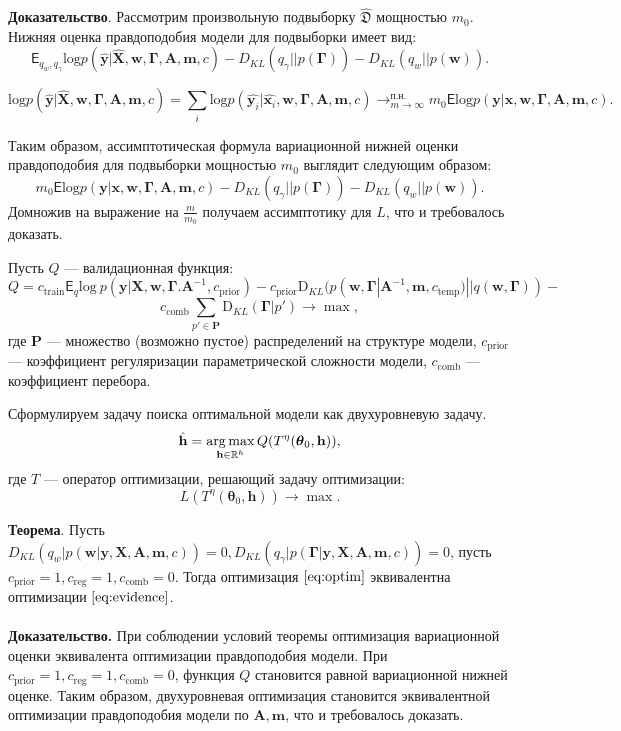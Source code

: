 \textbf{Доказательство}. Рассмотрим произвольную подвыборку $\hat{\mathfrak{D}}$ мощностью $m_0$. Нижняя оценка правдоподобия модели для подвыборки имеет вид:
\[
 \mathsf{E}_{q_w,q_\gamma}\text{log} p(\hat{\mathbf{y}}|\hat{\mathbf{X}},\mathbf{w}, \boldsymbol{\Gamma}, \mathbf{A},\mathbf{m}, c) - {D_{KL}}(q_\gamma||p(\boldsymbol{\Gamma})) - {D_{KL}}(q_{w}||p(\mathbf{w})).
\]

\[
\text{log} p(\hat{\mathbf{y}}|\hat{\mathbf{X}},\mathbf{w}, \boldsymbol{\Gamma}, \mathbf{A},\mathbf{m}, c) = \sum_i \text{log} p(\hat{\mathbf{y}_i}|\hat{\mathbf{x}_i},\mathbf{w}, \boldsymbol{\Gamma}, \mathbf{A},\mathbf{m}, c) \to^{\text{п.н.}}_{m \to \infty} m_0\mathsf{E}\text{log} p(\mathbf{y}|{\mathbf{x}},\mathbf{w}, \boldsymbol{\Gamma}, \mathbf{A},\mathbf{m}, c).
\]

Таким образом, ассимптотическая формула вариационной нижней оценки правдоподобия для подвыборки мощностью $m_0$ выглядит следующим образом:
\[
m_0\mathsf{E}\text{log} p(\mathbf{y}|{\mathbf{x}},\mathbf{w}, \boldsymbol{\Gamma}, \mathbf{A},\mathbf{m}, c) - {D_{KL}}(q_\gamma||p(\boldsymbol{\Gamma})) - {D_{KL}}(q_{w}||p(\mathbf{w})).
\]
Домножив на выражение на $\frac{m}{m_0}$ получаем ассимптотику для $L$, что и требовалось доказать.

Пусть $Q$ --- валидационная функция:
\[
Q = {c_\text{train}\mathsf{E}_q \text{log}~{p(\mathbf{y} | \mathbf{X}, \mathbf{w}, \boldsymbol{\Gamma}. \mathbf{A}^{-1}, c_{\text{prior}})}}
 - {c_\text{prior}\text{D}_{KL}(p(\mathbf{w}, \boldsymbol{\Gamma} |\mathbf{A}^{-1}, \mathbf{m}, c_{\text{temp}}) || q(\mathbf{w}, \boldsymbol{\Gamma}))} -\]
\[
{c_{\text{comb}}\sum_{p' \in \mathbf{P}} \text{D}_{KL}(\boldsymbol{\Gamma} | p')} \to \max, 
\]
где $\mathbf{P}$ --- множество (возможно пустое) распределений на структуре модели, $c_\text{prior}$ --- коэффициент регуляризации параметрической сложности модели, 
$c_{\text{comb}}$ --- коэффициент перебора.

Сформулируем задачу поиска оптимальной модели как двухуровневую задачу.
\begin{equation}
\label{eq:optim}
	\hat{\mathbf{h}} = \operatorname*{arg\,max}_{\mathbf{h} \in \mathbb{R}^h} Q( T^\eta(\boldsymbol{\theta}_0, \mathbf{h})),
\end{equation}
где $T$ --- оператор оптимизации, решающий задачу оптимизации:
\[
    L(T^\eta(\boldsymbol{\theta}_0, \mathbf{h})) \to \max.
\]


\textbf{Теорема}. Пусть $D_{KL}(q_w|p(\mathbf{w}|\mathbf{y}, \mathbf{X}, \mathbf{A},\mathbf{m}, c)) = 0, D_{KL}(q_\gamma|p(\boldsymbol{\Gamma}|\mathbf{y}, \mathbf{X}, \mathbf{A},\mathbf{m}, c)) = 0$, пусть $c_{\text{prior}} = 1, c_{\text{reg}} = 1, c_{\text{comb}} = 0$. Тогда оптимизация $\eqref{eq:optim}$ эквивалентна оптимизации $\eqref{eq:evidence}$.\\~\\
\textbf{Доказательство.} При соблюдении условий теоремы оптимизация вариационной оценки эквивалента оптимизации правдоподобия модели.
При $c_{\text{prior}} = 1, c_{\text{reg}} = 1, c_{\text{comb}} = 0$, функция $Q$ становится равной вариационной нижней оценке. 
Таким образом, двухуровневая оптимизация становится эквивалентной оптимизации правдоподобия модели по $\mathbf{A},\mathbf{m}$, что и требовалось доказать.


